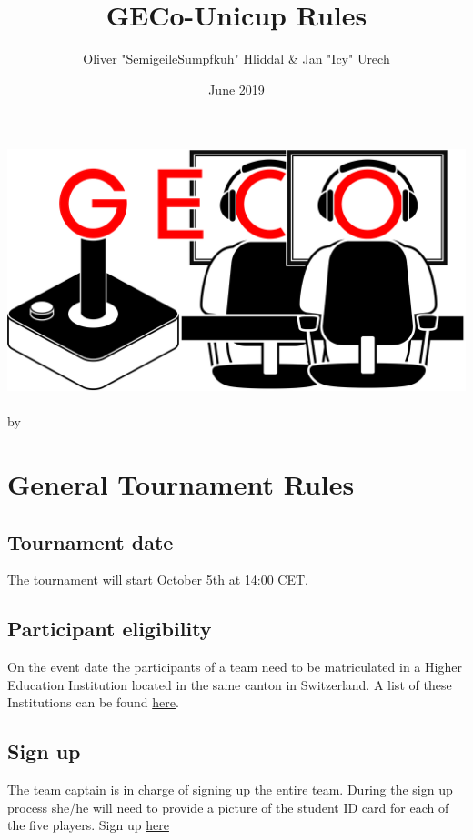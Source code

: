 \documentclass{article}
\title{GECo-Unicup Rules}
\author{Oliver "SemigeileSumpfkuh" Hliddal & Jan "Icy" Urech}
\date{June 2019}
\begin{document}
\makeatletter
\begin{titlepage}
\centering
\includegraphics[scale=0.075]{../img/GECo.png}\\
\LARGE \@title\\ \normalsize by \@author\\ \@date
\end{titlepage}
\makeatother

\clearpage

\tableofcontents
\clearpage

\section{General Tournament Rules}
 

\subsection{Tournament date}
The tournament will start October 5th at 14:00 CET.

\subsection{Participant eligibility}
On the event date the participants of a team need to be matriculated in a Higher Education Institution located in the same canton in Switzerland. A list of these Institutions can be found \href{https://www.swissuniversities.ch/en/higher-education-area/recognised-swiss-higher-education-institutions/}{here}.

\subsection{Sign up}
The team captain is in charge of signing up the entire team.
During the sign up process she/he will need to provide a picture of the student ID card for each of the five players. Sign up \href{https://www.toornament.com/tournaments/2637580453799936000/information}{here}
\end{document}
